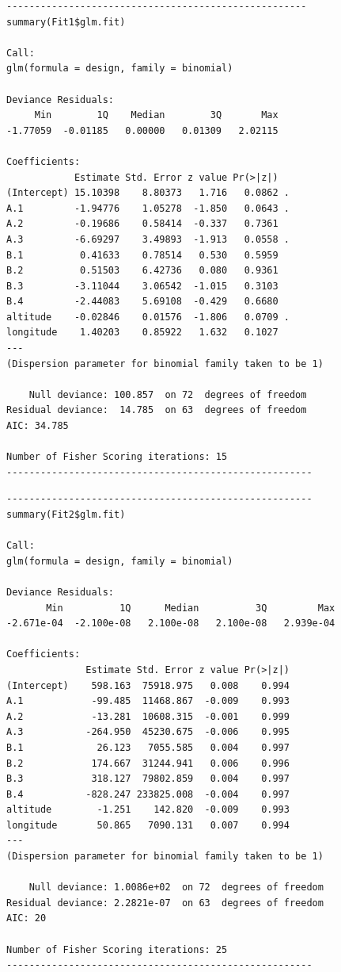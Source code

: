{\scriptsize
\noindent
\begin{minipage}[t]{.49\textwidth}
\raggedleft
\begin{verbatim}
-----------------------------------------------------
summary(Fit1$glm.fit)

Call:
glm(formula = design, family = binomial)

Deviance Residuals: 
     Min        1Q    Median        3Q       Max  
-1.77059  -0.01185   0.00000   0.01309   2.02115  

Coefficients:
            Estimate Std. Error z value Pr(>|z|)  
(Intercept) 15.10398    8.80373   1.716   0.0862 .
A.1         -1.94776    1.05278  -1.850   0.0643 .
A.2         -0.19686    0.58414  -0.337   0.7361  
A.3         -6.69297    3.49893  -1.913   0.0558 .
B.1          0.41633    0.78514   0.530   0.5959  
B.2          0.51503    6.42736   0.080   0.9361  
B.3         -3.11044    3.06542  -1.015   0.3103  
B.4         -2.44083    5.69108  -0.429   0.6680  
altitude    -0.02846    0.01576  -1.806   0.0709 .
longitude    1.40203    0.85922   1.632   0.1027  
---
(Dispersion parameter for binomial family taken to be 1)

    Null deviance: 100.857  on 72  degrees of freedom
Residual deviance:  14.785  on 63  degrees of freedom
AIC: 34.785

Number of Fisher Scoring iterations: 15
------------------------------------------------------
\end{verbatim}
\end{minipage}%
%
\hfill
%
\begin{minipage}[t]{.49\textwidth}
\raggedleft
\begin{verbatim}
------------------------------------------------------
summary(Fit2$glm.fit)

Call:
glm(formula = design, family = binomial)

Deviance Residuals: 
       Min          1Q      Median          3Q         Max  
-2.671e-04  -2.100e-08   2.100e-08   2.100e-08   2.939e-04  

Coefficients:
              Estimate Std. Error z value Pr(>|z|)
(Intercept)    598.163  75918.975   0.008    0.994
A.1            -99.485  11468.867  -0.009    0.993
A.2            -13.281  10608.315  -0.001    0.999
A.3           -264.950  45230.675  -0.006    0.995
B.1             26.123   7055.585   0.004    0.997
B.2            174.667  31244.941   0.006    0.996
B.3            318.127  79802.859   0.004    0.997
B.4           -828.247 233825.008  -0.004    0.997
altitude        -1.251    142.820  -0.009    0.993
longitude       50.865   7090.131   0.007    0.994
---
(Dispersion parameter for binomial family taken to be 1)

    Null deviance: 1.0086e+02  on 72  degrees of freedom
Residual deviance: 2.2821e-07  on 63  degrees of freedom
AIC: 20

Number of Fisher Scoring iterations: 25
------------------------------------------------------
\end{verbatim}
\end{minipage}
}
\label{glmsummary}

